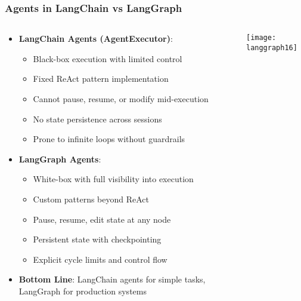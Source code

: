 \begin{frame}[fragile]\frametitle{Agents in LangChain vs LangGraph}

\begin{columns}
    \begin{column}[T]{0.6\linewidth}
      \begin{itemize}
        \item \textbf{LangChain Agents (AgentExecutor)}:
        \begin{itemize}
            \item Black-box execution with limited control
            \item Fixed ReAct pattern implementation
            \item Cannot pause, resume, or modify mid-execution
            \item No state persistence across sessions
            \item Prone to infinite loops without guardrails
        \end{itemize}
        \item \textbf{LangGraph Agents}:
        \begin{itemize}
            \item White-box with full visibility into execution
            \item Custom patterns beyond ReAct
            \item Pause, resume, edit state at any node
            \item Persistent state with checkpointing
            \item Explicit cycle limits and control flow
        \end{itemize}
        \item \textbf{Bottom Line}: LangChain agents for simple tasks, LangGraph for production systems
      \end{itemize}

    \end{column}
    \begin{column}[T]{0.4\linewidth}
\begin{center}
\texttt{[image: langgraph16]}
\end{center}
    \end{column}
  \end{columns}
  
  

\end{frame}

